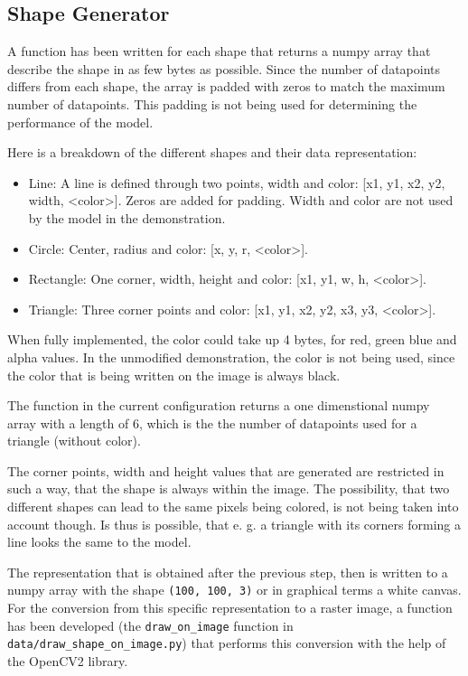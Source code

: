 \documentclass[12pt, a4paper, titlepage]{report}
\begin{document}
\subsection{Shape Generator}

A function has been written for each shape that returns a numpy array that describe the shape in as few bytes as possible. Since the number of datapoints differs from each shape, the array is padded with zeros to match the maximum number of datapoints. This padding is not being used for determining the performance of the model.

Here is a breakdown of the different shapes and their data representation:
\begin{itemize}
   \item Line: A line is defined through two points, width and color: [x1, y1, x2, y2, width, <color>]. Zeros are added for padding. Width and color are not used by the model in the demonstration.
   \item Circle: Center, radius and color: [x, y, r, <color>].
   \item Rectangle: One corner, width, height and color: [x1, y1, w, h, <color>].
   \item Triangle: Three corner points and color: [x1, y1, x2, y2, x3, y3, <color>].
\end{itemize}

When fully implemented, the color could take up 4 bytes, for red, green blue and alpha values. In the unmodified demonstration, the color is not being used, since the color that is being written on the image is always black.

The function in the current configuration returns a one dimenstional numpy array with a length of 6, which is the the number of datapoints used for a triangle (without color).


The corner points, width and height values that are generated are restricted in such a way, that the shape is always within the image. The possibility, that two different shapes can lead to the same pixels being colored, is not being taken into account though. Is thus is possible, that e. g. a triangle with its corners forming a line looks the same to the model.


The representation that is obtained after the previous step, then is written to a numpy array with the shape \lstinline{(100, 100, 3)} or in graphical terms a white canvas. For the conversion from this specific representation to a raster image, a function has been developed (the \lstinline{draw_on_image} function in \lstinline{data/draw_shape_on_image.py}) that performs this conversion with the help of the OpenCV2 library.
\end{document}
